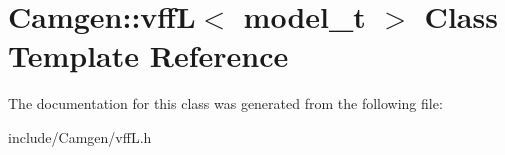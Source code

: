 \hypertarget{a00569}{\section{Camgen\-:\-:vff\-L$<$ model\-\_\-t $>$ Class Template Reference}
\label{a00569}
}


The documentation for this class was generated from the following file\-:\begin{DoxyCompactItemize}
\item 
include/\-Camgen/vff\-L.\-h\end{DoxyCompactItemize}
